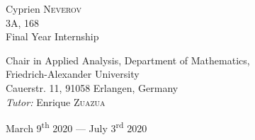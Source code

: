 \documentclass[12pt, letterpaper]{article}
\begin{document}
\begin{titlepage}
\begin{sffamily}
\begin{center}
    \begin{minipage}{0.4\textwidth}
      \begin{flushleft} \small
        Cyprien \textsc{Neverov}\\
        3A, 168\\ 
        Final Year Internship
      \end{flushleft}
    \end{minipage}
    \begin{minipage}{0.4\textwidth}
      \begin{flushright} \small
Chair in Applied Analysis, Department of Mathematics,\\
Friedrich-Alexander University\\
Cauerstr. 11, 91058 Erlangen, Germany\\
        \emph{Tutor:} Enrique \textsc{Zuazua}\\
      \end{flushright}
    \end{minipage}

    \vfill
    \vfill

    {\small March 9\textsuperscript{th} 2020 — July 3\textsuperscript{rd} 2020}

  \end{center}
  \end{sffamily}
\end{titlepage}
\end{document}
